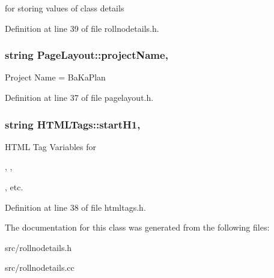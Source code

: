 for storing values of class details 



Definition at line 39 of file rollnodetails.\-h.

\hypertarget{classPageLayout_a8a3c1ddc422df2556fbc95d0cd575a05}{
\subsubsection[{project\-Name}]{\setlength{\rightskip}{0pt plus 5cm}string Page\-Layout\-::project\-Name\hspace{0.3cm}{\ttfamily [protected]}, {\ttfamily [inherited]}}}\label{classPageLayout_a8a3c1ddc422df2556fbc95d0cd575a05}
Project Name = Ba\-Ka\-Plan 

Definition at line 37 of file pagelayout.\-h.

\hypertarget{classHTMLTags_ae987289d0dab2e3e234048615f930d0f}{
\subsubsection[{start\-H1}]{\setlength{\rightskip}{0pt plus 5cm}string H\-T\-M\-L\-Tags\-::start\-H1\hspace{0.3cm}{\ttfamily [protected]}, {\ttfamily [inherited]}}}\label{classHTMLTags_ae987289d0dab2e3e234048615f930d0f}


H\-T\-M\-L Tag Variables for 

, , 

, etc. 



Definition at line 38 of file htmltags.\-h.



The documentation for this class was generated from the following files\-:\begin{DoxyCompactItemize}
\item 
src/rollnodetails.\-h\item 
src/rollnodetails.\-cc\end{DoxyCompactItemize}
